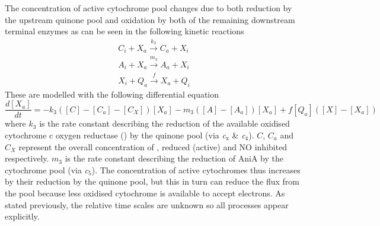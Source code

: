 The concentration of active cytochrome pool changes due to both reduction by the upstream quinone pool and oxidation by both of the remaining downstream terminal enzymes as can be seen in the following kinetic reactions
\begin{equation*}
\begin{gathered}
C_i + X_a \xrightarrow{k_3} C_a + X_i\\
A_i + X_a \xrightarrow{m_3} A_a + X_i\\
X_i + Q_a \xrightarrow{f} X_a + Q_i
\end{gathered}
\end{equation*}
These are modelled with the following differential equation
\begin{equation}
\frac{d[X_a]}{dt} = -k_3([C] - [C_a] - [C_X])[X_a]  - m_3([A] - [A_a])[X_a] + f[Q_a]([X]-[X_a])
\label{eq:cytochromes}
\end{equation}
where $k_3$ is the rate constant describing the reduction of the available oxidised cytochrome c oxygen reductase (\cbbthree{}) by the quinone pool (via \textit{c$_{\textrm{x}}$} \& \textit{c$_{\textrm{4}}$}). $C$, $C_a$ and $C_X$ represent the overall concentration of \cbbthree{}, reduced (active) \cbbthree{} and NO inhibited \cbbthree{} respectively. $m_3$ is the rate constant describing the reduction of AniA by the cytochrome pool (via \textit{c$_{\textrm{5}}$}). The concentration of active cytochromes thus increases by their reduction by the quinone pool, but this in turn can reduce the flux from the pool because less oxidised cytochrome is available to accept electrons. As stated previously, the relative time scales are unknown so all processes appear explicitly.

